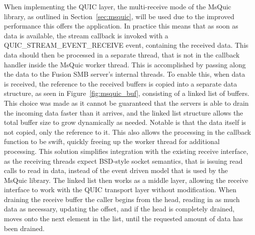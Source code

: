 \documentclass[english, 12pt, a4paper, elec, utf8, a-2b, online]{aaltothesis}
\begin{document}
When implementing the QUIC layer, the multi-receive mode of the MsQuic
library, as outlined in Section~\ref{sec:msquic}, will be used due to the improved performance
this offers the application. In practice this means that as soon as data is available,
the stream callback is invoked with a QUIC\_STREAM\_EVENT\_RECEIVE event, containing
the received data. This data should then be processed in a separate thread, that is not in
the callback handler inside the MsQuic worker thread. This is accomplished by passing
along the data to the Fusion SMB server's internal threads. To enable this,
when data is received, the reference to the received buffers is copied into a separate
data structure, as seen in Figure~\ref{fig:msquic_buf}, consisting of a linked list
of buffers. This choice was made as it cannot be guaranteed that the servers is able to drain 
the incoming data faster than it arrives, and the linked list structure allows
the total buffer size to grow dynamically as needed. Notable is that the data itself
is not copied, only the reference to it. This also allows the processing in the
callback function to be swift, quickly freeing up the worker thread for additional processing.
This solution simplifies integration with the existing receive interface, as the receiving threads
expect BSD-style socket semantics, that is issuing read calls to read in data, instead of the
event driven model that is used by the MsQuic library. The linked list then works as a middle
layer, allowing the receive interface to work with the QUIC transport layer without modification.
When draining the receive buffer the caller begins from the head, reading in as
much data as necessary, updating the offset, and if the head is completely drained,
moves onto the next element in the list, until the requested amount of data has
been drained.
\end{document}
